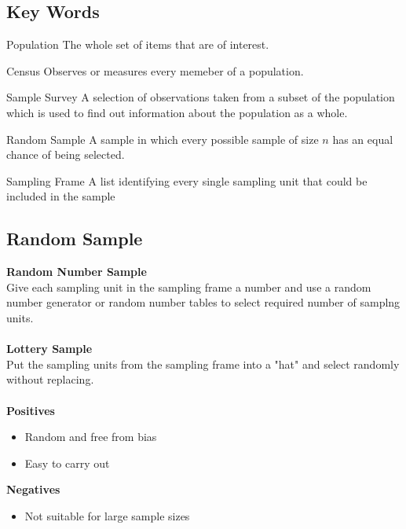 \documentclass{article}
\begin{document}
		\subsection{Key Words}
			\begin{description}
				\item{Population} The whole set of items that are of interest.
                                \item{Census} Observes or measures every memeber of a population.
                                \item{Sample Survey} A selection of observations taken from a subset of the population which is used to find out information about the population as a whole.
                                \item{Random Sample} A sample in which every possible sample of size $n$ has an equal chance of being selected.
				\item{Sampling Frame} A list identifying every single sampling unit that could be included in the sample
		\subsection{Random Sample}
			\textbf{Random Number Sample} \\
			Give each sampling unit in the sampling frame a number and use a random number generator or random number tables to select required number of samplng units. \\\\
			\textbf{Lottery Sample} \\
			Put the sampling units from the sampling frame into a "hat" and select randomly without replacing. \\\\
			\textbf{Positives}
			\begin{itemize}
				\item Random and free from bias
				\item Easy to carry out
			\end{itemize}
			\textbf{Negatives}
			\begin{itemize}
				\item Not suitable for large sample sizes
			\end{itemize}

\end{description}
\end{document}
